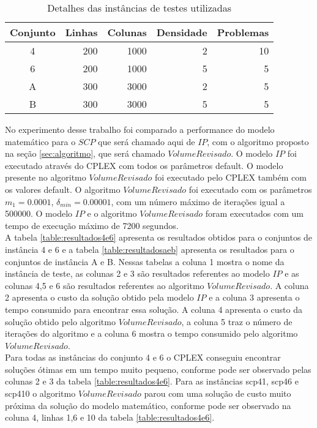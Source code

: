 \begin{table}[htbp]
\begin{center}
  \begin{tabular}{|c|r|r|r|r|}
    \hline
      Conjunto & Linhas   & Colunas & Densidade   & Problemas\\ \hline
      4        & 200      & 1000    & 2           & 10 \\ \hline
      6        & 200      & 1000    & 5           & 5 \\ \hline
      A        & 300      & 3000    & 2           & 5 \\ \hline
      B        & 300      & 3000    & 5           & 5 \\ \hline
  \end{tabular}
\caption{Detalhes das instâncias de testes utilizadas}
\label{table:instancias}
\end{center}
\end{table}
No experimento desse trabalho foi comparado a performance do modelo matemático para o $SCP$ que será 
chamado aqui de $IP$, com o algoritmo proposto na seção \ref{sec:algoritmo}, que será chamado $VolumeRevisado$.
O modelo $IP$ foi executado através do CPLEX com todos os parâmetros default. O modelo presente no algoritmo $VolumeRevisado$
foi executado pelo CPLEX também com os valores default. O algoritmo $VolumeRevisado$ foi executado com os parâmetros 
$m_1 = 0.0001$, $\delta_{min} = 0.00001$, com um número máximo de iterações igual a 500000. O modelo $IP$ e o algoritmo $VolumeRevisado$ foram executados com um tempo de execução máximo de 7200 segundos. \\
A tabela \ref{table:resultados4e6} apresenta os resultados obtidos para o conjuntos de instância 4 e 6 e a tabela
\ref{table:resultadosaeb} apresenta os resultados para o conjuntos de instância A e B. Nessas tabelas a
coluna 1 mostra o nome da instância de teste, as colunas 2 e 3 são resultados referentes ao modelo $IP$ e as colunas
4,5 e 6 são resultados referentes ao algoritmo $VolumeRevisado$. A coluna 2 apresenta o custo da solução obtido pela
modelo $IP$ e a coluna 3 apresenta o tempo consumido para encontrar essa solução. A coluna 4 apresenta o custo da solução 
obtido pelo algoritmo $VolumeRevisado$, a coluna 5 traz o número de iterações do algoritmo
e a coluna 6 mostra o tempo consumido pelo algoritmo $VolumeRevisado$.\\
Para todas as instâncias do conjunto 4 e 6 o CPLEX conseguiu encontrar soluções ótimas em um tempo muito pequeno, conforme
pode ser observado pelas colunas 2 e 3 da tabela \ref{table:resultados4e6}. Para as instâncias scp41, scp46 e scp410 o algoritmo
$VolumeRevisado$ parou com uma solução de custo muito próxima da solução do modelo matemático, conforme
pode ser observado na coluna 4, linhas 1,6 e 10 da tabela \ref{table:resultados4e6}.

